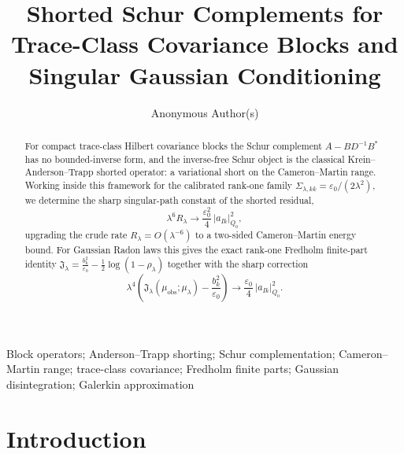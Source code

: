 \documentclass[preprint,12pt]{elsarticle}
\theoremstyle{plain}
\theoremstyle{definition}
\theoremstyle{remark}
\begin{document}
\begin{frontmatter}

\title{Shorted Schur Complements for Trace-Class Covariance Blocks and Singular Gaussian Conditioning}

\author{Anonymous Author(s)}


\begin{abstract}
        For compact trace-class Hilbert covariance blocks the Schur complement
        $A-BD^{-1}B^*$ has no bounded-inverse form, and the inverse-free Schur
        object is the classical Krein--Anderson--Trapp shorted operator: a
        variational short on the Cameron--Martin range.  Working inside this
        framework for the calibrated rank-one family
        $\Sigma_{\lambda,kk}=\varepsilon_0/(2\lambda^2)$, we determine the sharp
        singular-path constant of the shorted residual,
        \[
        \lambda^6 R_\lambda\longrightarrow\frac{\varepsilon_0^2}{4}\,|a_{Ik}|_{Q_0}^2,
        \]
        upgrading the crude rate $R_\lambda=O(\lambda^{-6})$ to a two-sided
        Cameron--Martin energy bound.  For Gaussian Radon laws this gives the
        exact rank-one Fredholm finite-part identity
        $\mathfrak{J}_\lambda=\frac{b_k^2}{\varepsilon_0}-\frac12\log(1-\rho_\lambda)$
        together with the sharp correction
        \[
        \lambda^4\!\left(\mathfrak{J}_\lambda(\mu_{\mathrm{obs}};\mu_\lambda)
        -\frac{b_k^2}{\varepsilon_0}\right)
        \longrightarrow\frac{\varepsilon_0}{4}\,|a_{Ik}|_{Q_0}^2 .
        \]
    \end{abstract}

    \begin{keyword}
Block operators; Anderson--Trapp shorting; Schur complementation; Cameron--Martin range; trace-class covariance; Fredholm finite parts; Gaussian disintegration; Galerkin approximation
\end{keyword}

\end{frontmatter}

    \section{Introduction}
    \label{sec:intro}
\end{document}
